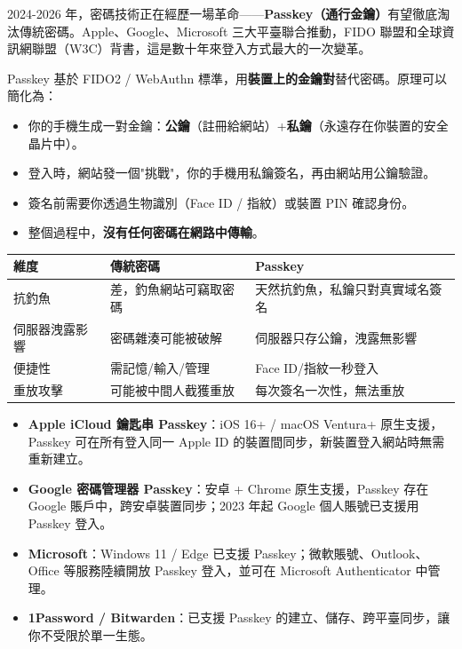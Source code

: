 
2024-2026 年，密碼技術正在經歷一場革命——\textbf{Passkey（通行金鑰）}有望徹底淘汰傳統密碼。Apple、Google、Microsoft 三大平臺聯合推動，FIDO 聯盟和全球資訊網聯盟（W3C）背書，這是數十年來登入方式最大的一次變革。


Passkey 基於 FIDO2 / WebAuthn 標準，用\textbf{裝置上的金鑰對}替代密碼。原理可以簡化為：

\begin{itemize}
  \item 你的手機生成一對金鑰：\textbf{公鑰}（註冊給網站）+\textbf{私鑰}（永遠存在你裝置的安全晶片中）。
  \item 登入時，網站發一個"挑戰"，你的手機用私鑰簽名，再由網站用公鑰驗證。
  \item 簽名前需要你透過生物識別（Face ID / 指紋）或裝置 PIN 確認身份。
  \item 整個過程中，\textbf{沒有任何密碼在網路中傳輸}。
\end{itemize}


\begin{center}
\begin{tabularx}{\linewidth}{|X|X|X|}
\hline
\textbf{維度} & \textbf{傳統密碼} & \textbf{Passkey} \tabularnewline
\hline
抗釣魚 & 差，釣魚網站可竊取密碼 & 天然抗釣魚，私鑰只對真實域名簽名 \tabularnewline
伺服器洩露影響 & 密碼雜湊可能被破解 & 伺服器只存公鑰，洩露無影響 \tabularnewline
便捷性 & 需記憶/輸入/管理 & Face ID/指紋一秒登入 \tabularnewline
重放攻擊 & 可能被中間人截獲重放 & 每次簽名一次性，無法重放 \tabularnewline
\hline
\end{tabularx}
\end{center}


\begin{itemize}
  \item \textbf{Apple iCloud 鑰匙串 Passkey}：iOS 16+ / macOS Ventura+ 原生支援，Passkey 可在所有登入同一 Apple ID 的裝置間同步，新裝置登入網站時無需重新建立。
  \item \textbf{Google 密碼管理器 Passkey}：安卓 + Chrome 原生支援，Passkey 存在 Google 賬戶中，跨安卓裝置同步；2023 年起 Google 個人賬號已支援用 Passkey 登入。
  \item \textbf{Microsoft}：Windows 11 / Edge 已支援 Passkey；微軟賬號、Outlook、Office 等服務陸續開放 Passkey 登入，並可在 Microsoft Authenticator 中管理。
  \item \textbf{1Password / Bitwarden}：已支援 Passkey 的建立、儲存、跨平臺同步，讓你不受限於單一生態。
\end{itemize}

